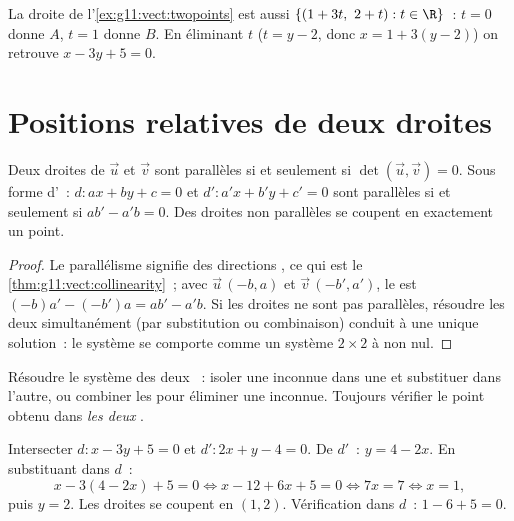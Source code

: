 \begin{example}
La droite de l'\cref{ex:g11:vect:twopoints} est aussi
$\{(1 + 3t,\ 2 + t) : t \in \R\}$~: $t = 0$ donne $A$, $t = 1$ donne $B$.
En éliminant $t$ ($t = y - 2$, donc $x = 1 + 3(y-2)$) on retrouve
$x - 3y + 5 = 0$.
\end{example}

\section{Positions relatives de deux droites}

\begin{proposition}\label{prop:g11:vect:positions}
Deux droites de  $\vec u$ et $\vec v$ sont parallèles
si et seulement si $\det(\vec u, \vec v) = 0$. Sous forme d'~:
$d : ax + by + c = 0$ et $d' : a'x + b'y + c' = 0$ sont parallèles si et
seulement si $ab' - a'b = 0$. Des droites non parallèles se coupent en
exactement un point.
\end{proposition}

\begin{proof}
Le parallélisme signifie des directions , ce qui est le
\cref{thm:g11:vect:collinearity}~; avec $\vec u\,(-b, a)$ et
$\vec v\,(-b', a')$, le  est $(-b)a' - (-b')a = ab' - a'b$.
Si les droites ne sont pas parallèles, résoudre les deux 
simultanément (par substitution ou combinaison) conduit à une unique
solution~: le système se comporte comme un système $2 \times 2$ à
 non nul.
\end{proof}

\begin{method}\label{met:g11:vect:intersection}
Résoudre le système des deux ~: isoler une inconnue dans une
 et substituer dans l'autre, ou combiner les  pour
éliminer une inconnue. Toujours vérifier le point obtenu dans
\emph{les deux} .
\end{method}

\begin{example}\label{ex:g11:vect:intersection}
Intersecter $d: x - 3y + 5 = 0$ et $d': 2x + y - 4 = 0$. De $d'$~:
$y = 4 - 2x$. En substituant dans $d$~:
\[
x - 3(4 - 2x) + 5 = 0
\iff x - 12 + 6x + 5 = 0
\iff 7x = 7
\iff x = 1,
\]
puis $y = 2$. Les droites se coupent en $(1, 2)$. Vérification dans
$d$~: $1 - 6 + 5 = 0$.
\end{example}

